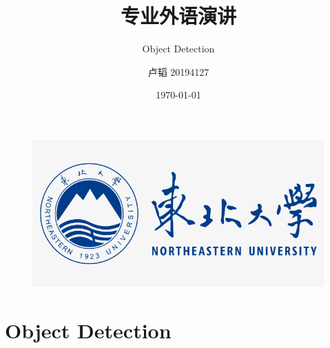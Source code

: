 \documentclass{beamer}
\author{卢韬 \textrm{20194127}}
\title{专业外语演讲}
\subtitle{\textrm{Object Detection}}
\institute{自动化1903}
\date{\today}
\begin{document}


\kaishu
\begin{frame}
    \titlepage
    \begin{figure}[htpb]
        \begin{center}
            \includegraphics[width=0.2\linewidth]{pic/Suda_Log.png}
        \end{center}
    \end{figure}
\end{frame}

\begin{frame}
    \tableofcontents[sectionstyle=show,subsectionstyle=show/shaded/hide,subsubsectionstyle=show/shaded/hide]
\end{frame}


\section{Object Detection}
\end{document}
